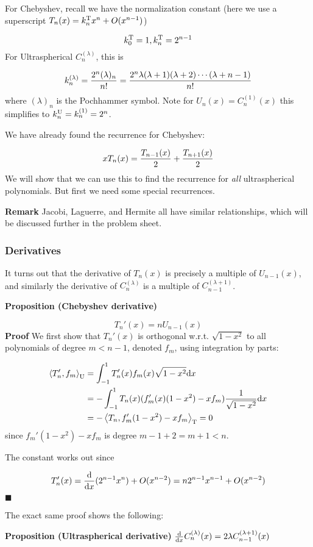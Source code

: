 \documentclass[12pt,a4paper]{article}
\def\D{ {\rm d} }
\def\addtab#1={#1\;&=}
\def\ccr{\\\addtab}
\def\ip<#1>{\left\langle{#1}\right\rangle}
\def\dx{\D x}
\def\addtab#1={#1\;&=}
\def\ccr{\\\addtab}
\begin{document}
For Chebyshev, recall we have the normalization constant (here we use a superscript $T_n(x) = k_n^{\rm T} x^n + O(x^{n-1})$)

\[
k_0^{\rm T} = 1, k_n^{\rm T} = 2^{n-1}
\]
For Ultraspherical $C_n^{(\lambda)}$, this is

\[
k_n^{(\lambda)} = {2^n (\lambda)_n \over n!} = {2^n \lambda (\lambda+1) (\lambda+2) \cdots (\lambda+n-1)  \over n!}
\]
where $(\lambda)_n$ is the Pochhammer symbol. Note for $U_n(x) = C_n^{(1)}(x)$ this simplifies to $k_n^{\rm U} = k_n^{(1)} = 2^n$.

We have  already found the recurrence for Chebyshev:

\[
x T_n(x) = {T_{n-1}(x) \over 2} +  {T_{n+1}(x) \over 2}
\]
We will show that we can use this to find the recurrence for \emph{all} ultraspherical polynomials. But first we need some special recurrences.

\textbf{Remark} Jacobi, Laguerre, and Hermite all have similar relationships, which will be discussed further in the problem sheet.

\subsubsection{Derivatives}
It turns out that the derivative of $T_n(x)$ is precisely a multiple of  $U_{n-1}(x)$, and similarly the derivative of $C_n^{(\lambda)}$ is a multiple of $C_{n-1}^{(\lambda+1)}$.

\textbf{Proposition (Chebyshev derivative)}

\[
T_n'(x) = n U_{n-1}(x)
\]
\textbf{Proof} We first show that $T_n'(x)$ is orthogonal w.r.t. $\sqrt{1-x^2}$ to all  polynomials of degree $m < n-1$, denoted $f_m$, using integration by parts:


\begin{align*}
\ip<T_n',f_m>_{\rm U} &= \int_{-1}^1 T_n'(x) f_m(x) \sqrt{1-x^2} \dx \ccr
= -\int_{-1}^1 T_n(x) (f_m'(x)(1-x^2) - xf_m) {1  \over \sqrt{1-x^2}} \dx  \ccr
= - \ip<T_n, f_m'(1-x^2) - x f_m >_{\rm T}  = 0
\end{align*}
since $f_m'(1-x^2) - x f_m $ is degree $m-1 +2 = m+1 < n$.

The constant works out since

\[
T_n'(x) = {\D \over \dx} (2^{n-1} x^n)  + O(x^{n-2}) = n 2^{n-1} x^{n-1} + O(x^{n-2})
\]
\ensuremath{\blacksquare}

The exact same proof shows the following:

\textbf{Proposition (Ultraspherical derivative)} ${\D \over \dx} C_n^{(\lambda)}(x) = 2 \lambda  C_{n-1}^{(\lambda+1)}(x)$
\end{document}
